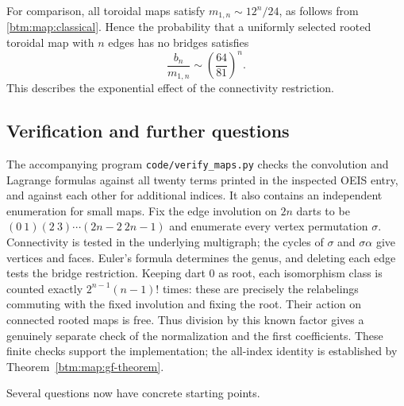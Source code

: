 \documentclass[11pt,letterpaper]{article}
\numberwithin{equation}{section}
\theoremstyle{definition}
\theoremstyle{remark}
\begin{document}
For comparison, all toroidal maps satisfy $m_{1,n}\sim12^n/24$, as follows
from \eqref{btm:map:classical}.  Hence the probability that a uniformly
selected rooted toroidal map with $n$ edges has no bridges satisfies
\begin{equation}
 \label{btm:map:probability}
 \frac{b_n}{m_{1,n}}\sim\left(\frac{64}{81}\right)^n.
\end{equation}
This describes the exponential effect of the connectivity restriction.

\subsection{Verification and further questions}
\label{btm:map:verification}

The accompanying program \texttt{code/verify\_maps.py} checks the
convolution and Lagrange formulas against all twenty terms printed in the
inspected OEIS entry, and against each other for additional indices.
It also contains an independent enumeration for small maps.  Fix the edge
involution on $2n$ darts to be
$(0\ 1)(2\ 3)\cdots(2n-2\ 2n-1)$ and enumerate every vertex permutation
$\sigma$.  Connectivity is tested in the underlying multigraph; the
cycles of $\sigma$ and $\sigma\alpha$ give vertices and faces.  Euler's
formula determines the genus, and deleting each edge tests the bridge
restriction.  Keeping dart $0$ as root, each isomorphism class is counted
exactly $2^{n-1}(n-1)!$ times: these are precisely the relabelings
commuting with the fixed involution and fixing the root.  Their action
on connected rooted maps is free.  Thus division by this known factor
gives a genuinely separate check of the normalization and the first
coefficients.  These finite checks support the implementation; the
all-index identity is established by Theorem~\ref{btm:map:gf-theorem}.

Several questions now have concrete starting points.
\end{document}
